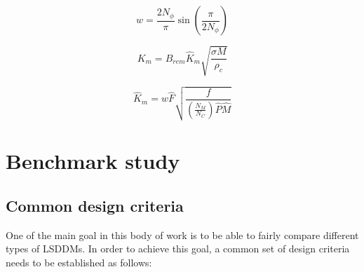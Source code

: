         \begin{equation}
            w = \frac{{2{N_\phi }}}{\pi }\sin \left( {\frac{\pi }{{2{N_\phi }}}} \right)
            \label{eq:winding factor}
        \end{equation}
        
        
        \begin{equation}
            {K_m} = {B_{rem}}{\hat K_m}\sqrt {\frac{{\sigma M}}{{{\rho _c}}}}
            \label{eq:K_m}
        \end{equation}
        
        
        \begin{equation}
            {\hat K_m} = w\hat F\sqrt {\frac{f}{{( {\frac{{{N_M}}}{{{N_C}}}} )\hat P\hat M}}}
            \label{eq:K_m dimless}
        \end{equation}
           
        
\section{Benchmark study}                       \label{Chapter:PMLSM design HM/benchmark study}


    \subsection{Common design criteria}         \label{Chapter:PMLSM design HM/design optimization/design citeria}
    
    
        One of the main goal in this body of work is to be able to fairly compare different types of \acsp{LSDDM}. In order to achieve this goal, a common set of design criteria needs to be established as follows:
        

